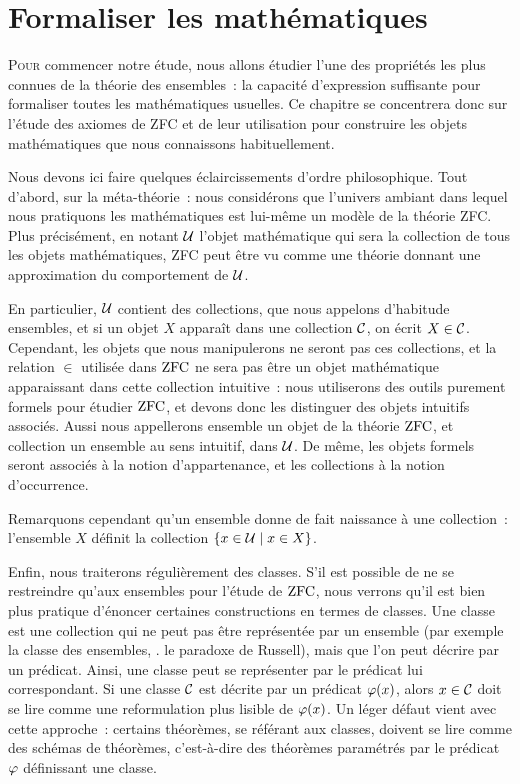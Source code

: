 \chapter{Formaliser les mathématiques}
\label{chp.axiomes}

\minitoc

\lettrine{P}{our} commencer notre étude, nous allons étudier l'une des
propriétés les plus connues de la théorie des ensembles~: la capacité
d'expression suffisante pour formaliser toutes les mathématiques usuelles. Ce
chapitre se concentrera donc sur l'étude des axiomes de ZFC et de leur
utilisation pour construire les objets mathématiques que nous connaissons
habituellement.

Nous devons ici faire quelques éclaircissements d'ordre philosophique. Tout
d'abord, sur la méta-théorie~: nous considérons que l'univers ambiant dans
lequel nous pratiquons les mathématiques est lui-même un modèle de la théorie
ZFC. Plus précisément, en notant $\mathcal{U}$ l'objet mathématique qui sera la
collection de tous les objets mathématiques, ZFC peut être vu comme une théorie
donnant une approximation du comportement de $\mathcal{U}$.

En particulier, $\mathcal{U}$ contient des collections, que nous appelons
d'habitude ensembles, et si un objet $X$ apparaît dans une collection $\mathcal{C}$,
on écrit $X\in\mathcal{C}$. Cependant, les objets que nous manipulerons ne seront pas
ces collections, et la relation $\in$ utilisée dans $\operatorname{ZFC}$ ne sera pas \og être
un objet mathématique apparaissant dans cette collection intuitive\fg{}~: nous
utiliserons des outils purement formels pour étudier $\operatorname{ZFC}$, et devons donc les
distinguer des objets intuitifs associés. Aussi nous appellerons
\og ensemble\fg{} un objet de la théorie $\operatorname{ZFC}$, et \og collection\fg{} un
ensemble au sens intuitif, dans $\mathcal{U}$. De même, les objets formels seront
associés à la notion d'appartenance, et les collections à la notion
d'occurrence.

Remarquons cependant qu'un ensemble donne de fait naissance à une
collection~: l'ensemble $X$ définit la collection
$\left\{ x \in\mathcal{U} \;\middle\vert\; x \in X \right\}$.

Enfin, nous traiterons régulièrement des classes. S'il est possible de ne se
restreindre qu'aux ensembles pour l'étude de $\operatorname{ZFC}$, nous verrons qu'il est bien
plus pratique d'énoncer certaines constructions en termes de classes. Une classe
est une collection qui ne peut pas être représentée par un ensemble (par exemple
la classe des ensembles, . le paradoxe de Russell), mais que l'on
peut décrire par un prédicat. Ainsi, une classe peut se représenter par le
prédicat lui correspondant. Si une classe $\mathcal{C}$ est décrite par un prédicat
$\varphi(x)$, alors $x\in\mathcal{C}$ doit se lire comme une reformulation plus
lisible de $\varphi(x)$. Un léger défaut vient avec cette approche~: certains
théorèmes, se référant aux classes, doivent se lire comme des schémas de
théorèmes, c'est-à-dire des théorèmes paramétrés par le prédicat $\varphi$
définissant une classe.

